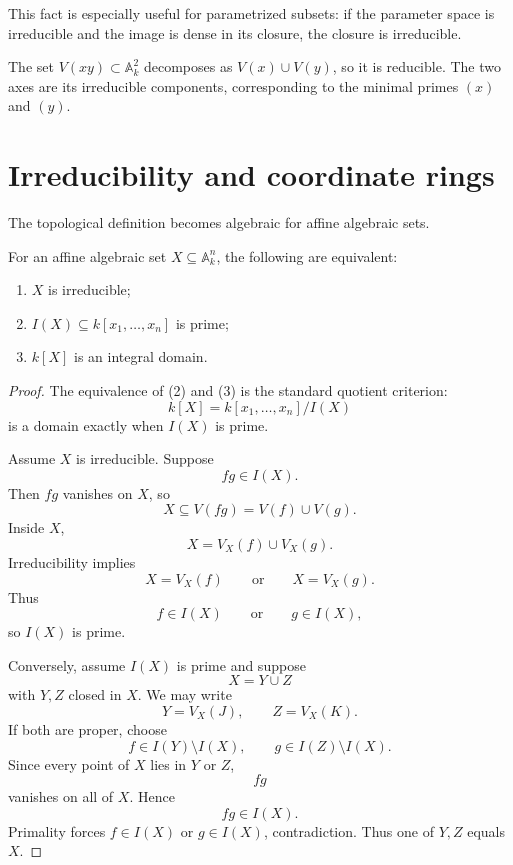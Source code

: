 This fact is especially useful for parametrized subsets: if the parameter space is
irreducible and the image is dense in its closure, the closure is irreducible.

\begin{example}\label{ex:vi05-expand-01}
The set $V(xy)\subset\mathbb A^2_k$ decomposes as $V(x)\cup V(y)$, so it is reducible.  The two axes are its irreducible components, corresponding to the minimal primes $(x)$ and $(y)$.
\end{example}
\section{Irreducibility and coordinate rings}

The topological definition becomes algebraic for affine algebraic sets.

\begin{theorem}
\label{thm:vi05-prime-criterion}
For an affine algebraic set \(X\subseteq\mathbb A_k^n\), the following are equivalent:
\begin{enumerate}
  \item \(X\) is irreducible;
  \item \(I(X)\subseteq k[x_1,\dots,x_n]\) is prime;
  \item \(k[X]\) is an integral domain.
\end{enumerate}
\end{theorem}

\begin{proof}
The equivalence of (2) and (3) is the standard quotient criterion:
\[
k[X]=k[x_1,\dots,x_n]/I(X)
\]
is a domain exactly when \(I(X)\) is prime.

Assume \(X\) is irreducible.  Suppose
\[
fg\in I(X).
\]
Then \(fg\) vanishes on \(X\), so
\[
X\subseteq V(fg)=V(f)\cup V(g).
\]
Inside \(X\),
\[
X=V_X(f)\cup V_X(g).
\]
Irreducibility implies
\[
X=V_X(f)
\qquad\text{or}\qquad
X=V_X(g).
\]
Thus
\[
f\in I(X)
\qquad\text{or}\qquad
g\in I(X),
\]
so \(I(X)\) is prime.

Conversely, assume \(I(X)\) is prime and suppose
\[
X=Y\cup Z
\]
with \(Y,Z\) closed in \(X\).  We may write
\[
Y=V_X(J),
\qquad
Z=V_X(K).
\]
If both are proper, choose
\[
f\in I(Y)\setminus I(X),
\qquad
g\in I(Z)\setminus I(X).
\]
Since every point of \(X\) lies in \(Y\) or \(Z\),
\[
fg
\]
vanishes on all of \(X\).  Hence
\[
fg\in I(X).
\]
Primality forces \(f\in I(X)\) or \(g\in I(X)\), contradiction.  Thus one of \(Y,Z\) equals \(X\).
\end{proof}


